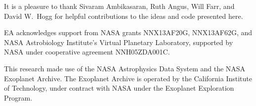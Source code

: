 \documentclass[manuscript, letterpaper]{aastex6}
\newcommand{\project}[1]{\textsf{#1}}
\begin{document}
%
%

\acknowledgments
It is a pleasure to thank
Sivaram Ambikasaran,
Ruth Angus,
Will Farr,
and
David W.\ Hogg
for helpful contributions to the ideas and code presented here.

EA acknowledges support from NASA grants NNX13AF20G, NNX13AF62G, and
NASA Astrobiology Institute's Virtual Planetary Laboratory, supported
by NASA under cooperative agreement NNH05ZDA001C.

This research made use of the NASA \project{Astrophysics Data System} and the
NASA Exoplanet Archive.
The Exoplanet Archive is operated by the California Institute of Technology,
under contract with NASA under the Exoplanet Exploration Program.
\end{document}
